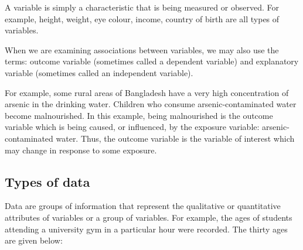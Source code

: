 \documentclass[
]{memoir}
\begin{document}
A variable is simply a characteristic that is being measured or observed. For example, height, weight, eye colour, income, country of birth are all types of variables.

When we are examining associations between variables, we may also use the terms: outcome variable (sometimes called a dependent variable) and explanatory variable (sometimes called an independent variable).

For example, some rural areas of Bangladesh have a very high concentration of arsenic in the drinking water. Children who consume arsenic-contaminated water become malnourished. In this example, being malnourished is the outcome variable which is being caused, or influenced, by the exposure variable: arsenic-contaminated water. Thus, the outcome variable is the variable of interest which may change in response to some exposure.

\hypertarget{types-of-data}{%
\subsection{Types of data}\label{types-of-data}}

Data are groups of information that represent the qualitative or quantitative attributes of variables or a group of variables. For example, the ages of students attending a university gym in a particular hour were recorded. The thirty ages are given below:

 
  \providecommand{\huxb}[2]{\arrayrulecolor[RGB]{#1}\global\arrayrulewidth=#2pt}
  \providecommand{\huxvb}[2]{\color[RGB]{#1}\vrule width #2pt}
  \providecommand{\huxtpad}[1]{\rule{0pt}{#1}}
  \providecommand{\huxbpad}[1]{\rule[-#1]{0pt}{#1}}
\end{document}
